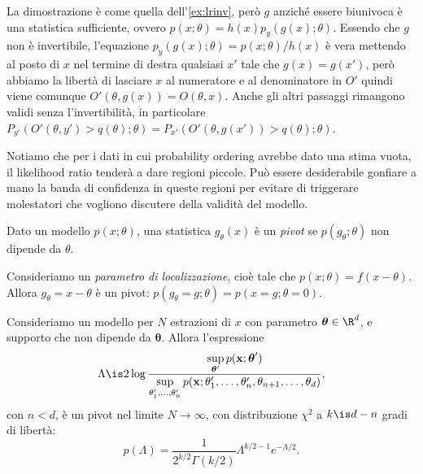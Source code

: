 \begin{solution}
    La dimostrazione è come quella dell'\autoref{ex:lrinv}, però $g$ anziché
    essere biunivoca è una statistica sufficiente, ovvero $p(x;\theta) = h(x)
    p_y(g(x);\theta)$. Essendo che $g$ non è invertibile, l'equazione
    $p_y(g(x);\theta) = p(x;\theta)/h(x)$ è vera mettendo al posto di $x$ nel
    termine di destra qualsiasi $x'$ tale che $g(x) = g(x')$, però abbiamo la
    libertà di lasciare $x$ al numeratore e al denominatore in $O'$ quindi
    viene comunque $O'(\theta,g(x)) = O(\theta, x)$. Anche gli altri passaggi
    rimangono validi senza l'invertibilità, in particolare $P_{y'}(O'(\theta,
    y') > q(\theta);\theta) = P_{x'}(O'(\theta, g(x')) > q(\theta);\theta)$.
\end{solution}


Notiamo che per i dati in cui probability ordering avrebbe dato una stima
vuota, il likelihood ratio tenderà a dare regioni piccole. Può essere
desiderabile gonfiare a mano la banda di confidenza in queste regioni per
evitare di triggerare molestatori che vogliono discutere della validità del
modello.

\begin{definition}[Pivot]
	Dato un modello $p(x;\theta)$,
	una statistica $g_\theta(x)$ è un \emph{pivot}
	se $p(g_\theta;\theta)$ non dipende da $\theta$.
\end{definition}

\begin{example}
	Consideriamo un \emph{parametro di localizzazione},
	cioè tale che $p(x;\theta)=f(x-\theta)$.
	Allora $g_\theta=x-\theta$ è un pivot:
	$p(g_\theta=g;\theta) = p(x=g;\theta=0)$.
\end{example}

\begin{fact}
	\label{th:wilks}
	Consideriamo un modello per $N$ estrazioni di $x$ con parametro $\boldsymbol\theta\in\R^d$,
	e supporto che non dipende da $\boldsymbol\theta$.
	Allora l'espressione
	\begin{equation*}
		\Lambda \is
		2\log\frac {\sup\limits_{\boldsymbol\theta'} p(\mathbf x;\boldsymbol\theta')}
		{\sup\limits_{\theta_1',\dotsc,\theta_n'} p(\mathbf x;\theta_1',\dotsc,\theta_n',\theta_{n+1},\dots,\theta_d)},
	\end{equation*}
    con $n < d$,
	è un pivot nel limite $N\to\infty$,
	con distribuzione $\chi^2$ a $k\is d-n$ gradi di libertà:
	\begin{equation*}
		p(\Lambda)
		= \frac1{2^{k/2}\Gamma(k/2)} \Lambda^{k/2-1} e^{-\Lambda/2}.
	\end{equation*}
\end{fact}

